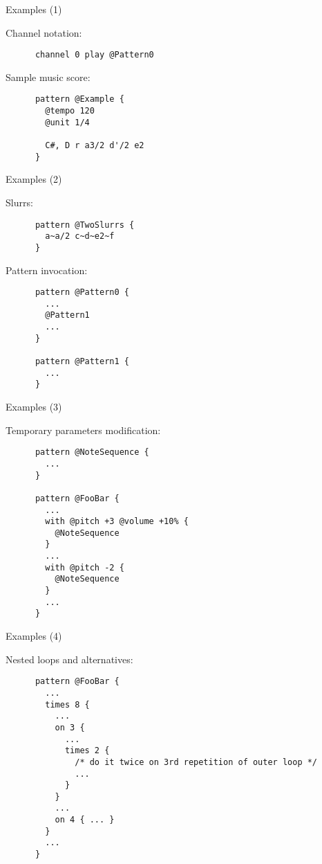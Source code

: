 \documentclass[10pt]{beamer}
\begin{document}
\begin{frame}[fragile]{Examples (1)}
  \begin{block}{Channel notation:}
    \begin{lstlisting}
      channel 0 play @Pattern0
    \end{lstlisting}
  \end{block}

  \begin{block}{Sample music score:}
    \begin{lstlisting}
      pattern @Example {
        @tempo 120
        @unit 1/4

        C#, D r a3/2 d'/2 e2
      }
    \end{lstlisting}
  \end{block}
\end{frame}

\begin{frame}[fragile]{Examples (2)}
  \begin{block}{Slurrs:}
    \begin{lstlisting}
      pattern @TwoSlurrs {
        a~a/2 c~d~e2~f
      }
    \end{lstlisting}
  \end{block}

  \begin{block}{Pattern invocation:}
    \begin{lstlisting}
      pattern @Pattern0 {
        ...
        @Pattern1
        ... 
      }

      pattern @Pattern1 {
        ...
      }
    \end{lstlisting}
  \end{block}
\end{frame}

\begin{frame}[fragile]{Examples (3)}
  \begin{block}{Temporary parameters modification:}
    \begin{lstlisting}
      pattern @NoteSequence {
        ...
      }

      pattern @FooBar {
        ...
        with @pitch +3 @volume +10% {
          @NoteSequence
        }
        ...
        with @pitch -2 {
          @NoteSequence
        }
        ...
      }
    \end{lstlisting}
  \end{block}
\end{frame}

\begin{frame}[fragile]{Examples (4)}
  \begin{block}{Nested loops and alternatives:}
    \begin{lstlisting}
      pattern @FooBar {
        ...
        times 8 {
          ...
          on 3 {
            ...
            times 2 {
              /* do it twice on 3rd repetition of outer loop */
              ...
            }
          }
          ... 
          on 4 { ... }
        }
        ...
      }
    \end{lstlisting}
  \end{block}
\end{frame}
\end{document}
